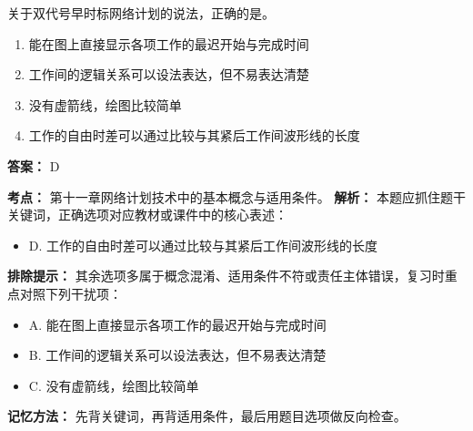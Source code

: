 \documentclass[UTF8,fontset=fandol,11pt]{ctexart}
\begin{document}
\begin{quizbox}[title={第 11 题}]
关于双代号早时标网络计划的说法，正确的是。\\
\begin{enumerate}[label=\Alph*.]
\item 能在图上直接显示各项工作的最迟开始与完成时间
\item 工作间的逻辑关系可以设法表达，但不易表达清楚
\item 没有虚箭线，绘图比较简单
\item 工作的自由时差可以通过比较与其紧后工作间波形线的长度
\end{enumerate}
\textbf{答案：} D
\vspace{0.25em}
\begin{answerbox}[title={考点解析}]
\textbf{考点：} 第十一章网络计划技术中的基本概念与适用条件。
\textbf{解析：} 本题应抓住题干关键词，正确选项对应教材或课件中的核心表述：
\begin{itemize}
\item D. 工作的自由时差可以通过比较与其紧后工作间波形线的长度
\end{itemize}
\textbf{排除提示：} 其余选项多属于概念混淆、适用条件不符或责任主体错误，复习时重点对照下列干扰项：
\begin{itemize}
\item A. 能在图上直接显示各项工作的最迟开始与完成时间
\item B. 工作间的逻辑关系可以设法表达，但不易表达清楚
\item C. 没有虚箭线，绘图比较简单
\end{itemize}
\textbf{记忆方法：} 先背关键词，再背适用条件，最后用题目选项做反向检查。
\end{answerbox}
\end{quizbox}
\end{document}
